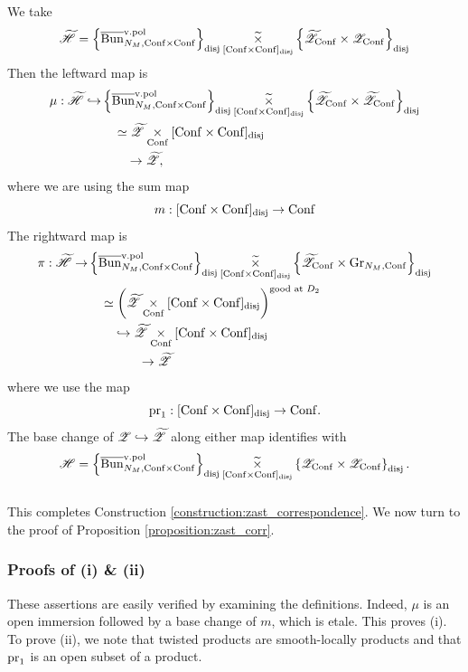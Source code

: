 \subsubsection{} We take
  \[
  \HHt = \left\{ \Bunc_{N_M, \Conf \times \Conf}^{\vpol} \right\}_\disj \underset{[\Conf \times \Conf]_\disj}{\timest} \left\{ \ZZt_\Conf \times \ZZ_\Conf \right\}_\disj
  \]
Then the leftward map is
\begin{align*}
    \mu : \HHt \mon
    & \left\{ \Bunc_{N_M, \Conf \times \Conf}^{\vpol} \right\}_\disj \underset{[\Conf \times \Conf]_\disj}{\timest} \left\{ \ZZt_\Conf \times \ZZt_\Conf \right\}_\disj \\
    & \quad \simeq \ZZt \underset{\Conf}{\times} [\Conf \times \Conf]_\disj \\
    & \qquad \to \ZZt,
\end{align*}
where we are using the sum map
    \[
    m : [\Conf \times \Conf]_\disj \to \Conf
    \]
The rightward map is
\begin{align*}
   \pi : \HHt \to 
    & \left\{ \Bunc_{N_M, \Conf \times \Conf}^{\vpol} \right\}_\disj \underset{[\Conf \times \Conf]_\disj}{\timest} \left\{ \ZZt_\Conf \times \Gr_{N_M, \Conf} \right\}_\disj \\
    & \quad \simeq \left( \ZZt \underset{\Conf}{\times} [\Conf \times \Conf]_\disj \right)^{\text{good at $D_2$}} \\
    & \qquad \mon \ZZt \underset{\Conf}{\times} [\Conf \times \Conf]_\disj \\
    & \qquad \qquad \to \ZZt
\end{align*}
where we use the map
  \[\pr_1 : [\Conf \times \Conf]_\disj \to \Conf.\]
The base change of $\ZZ \mon \ZZt$ along either map identifies with
  \[\HH = \left\{ \Bunc_{N_M, \Conf \times \Conf}^{\vpol} \right\}_\disj \underset{[\Conf \times \Conf]_\disj}{\timest} \left\{ \ZZ_\Conf \times \ZZ_\Conf \right\}_\disj.\]

\subsubsection{} This completes Construction \ref{construction:zast_correspondence}. We now turn to the proof of Proposition \ref{proposition:zast_corr}.

\subsubsection{Proofs of (i) \& (ii)} These assertions are easily verified by examining the definitions. Indeed, $\mu$ is an open immersion followed by a base change of $m$, which is etale. This proves (i). To prove (ii), we note that twisted products are smooth-locally products and that $\pr_1$ is an open subset of a product.

